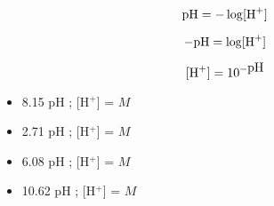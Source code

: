 





$$\hbox{pH} = - \log [\hbox{H}^{+}]$$

$$-\hbox{pH} = \log [\hbox{H}^{+}]$$

$$[\hbox{H}^{+}] = 10^{-\hbox{pH}}$$

\begin{itemize}
\item{} 8.15 pH ; [H$^{+}$] =  $M$
\vskip 5pt
\item{} 2.71 pH ; [H$^{+}$] =  $M$
\vskip 5pt
\item{} 6.08 pH ; [H$^{+}$] =  $M$
\vskip 5pt
\item{} 10.62 pH ; [H$^{+}$] =  $M$
\end{itemize}




